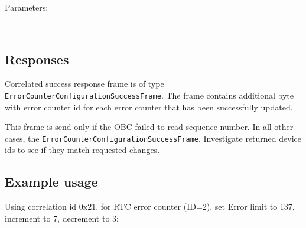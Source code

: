 Parameters:

\begin{tcarglist}
	\hline 
	 \\
	\hline 
\end{tcarglist}


\subsection{Responses}
Correlated success response frame is of type \texttt{ErrorCounterConfigurationSuccessFrame}. The frame contains additional byte with error counter id for each error counter that has been successfully updated.


This frame is send only if the OBC failed to read sequence number. In all other cases, the \texttt{ErrorCounterConfigurationSuccessFrame}. Investigate returned device ids to see if they match requested changes.

\subsection{Example usage}
Using correlation id 0x21, for RTC error counter (ID=2), set Error limit to 137, increment to 7, decrement to 3:
